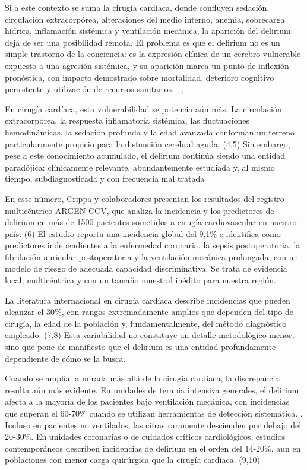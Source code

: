 \documentclass{article}
\begin{document}
Si a este contexto se suma la cirugía cardíaca, donde confluyen sedación, circulación extracorpórea, alteraciones del medio interno, anemia, sobrecarga hídrica, inflamación sistémica y ventilación mecánica, la aparición del delirium deja de ser una posibilidad remota. El problema es que el delirium no es un simple trastorno de la conciencia: es la expresión clínica de un cerebro vulnerable expuesto a una agresión sistémica, y su aparición marca un punto de inflexión pronóstica, con impacto demostrado sobre mortalidad, deterioro cognitivo persistente y utilización de recursos sanitarios. \cite{1262-ELY2004}, \cite{1298-INOUYE2014}, \cite{1299-WILSON2020}

En cirugía cardíaca, esta vulnerabilidad se potencia aún más. La circulación extracorpórea, la respuesta inflamatoria sistémica, las fluctuaciones hemodinámicas, la sedación profunda y la edad avanzada conforman un terreno particularmente propicio para la disfunción cerebral aguda. (4,5) Sin embargo, pese a este conocimiento acumulado, el delirium continúa siendo una entidad paradójica: clínicamente relevante, abundantemente estudiada y, al mismo tiempo, subdiagnosticada y con frecuencia mal tratada

En este número, Crippa y colaboradores presentan los resultados del registro multicéntrico ARGEN-CCV, que analiza la incidencia y los predictores de delirium en más de 1500 pacientes sometidos a cirugía cardiovascular en nuestro país. (6) El estudio reporta una incidencia global del 9,1\% e identifica como predictores independientes a la enfermedad coronaria, la sepsis postoperatoria, la fibrilación auricular postoperatoria y la ventilación mecánica prolongada, con un modelo de riesgo de adecuada capacidad discriminativa. Se trata de evidencia local, multicéntrica y con un tamaño muestral inédito para nuestra región.

La literatura internacional en cirugía cardíaca describe incidencias que pueden alcanzar el 30\%, con rangos extremadamente amplios que dependen del tipo de cirugía, la edad de la población y, fundamentalmente, del método diagnóstico empleado. (7,8) Esta variabilidad no constituye un detalle metodológico menor, sino que pone de manifiesto que el delirium es una entidad profundamente dependiente de cómo se la busca.

Cuando se amplía la mirada más allá de la cirugía cardíaca, la discrepancia resulta aún más evidente. En unidades de terapia intensiva generales, el delirium afecta a la mayoría de los pacientes bajo ventilación mecánica, con incidencias que superan el 60-70\% cuando se utilizan herramientas de detección sistemática. \cite{1262-ELY2004}, \cite{1298-INOUYE2014} Incluso en pacientes no ventilados, las cifras raramente descienden por debajo del 20-30\%. En unidades coronarias o de cuidados críticos cardiológicos, estudios contemporáneos describen incidencias de delirium en el orden del 14-20\%, aun en poblaciones con menor carga quirúrgica que la cirugía cardíaca. (9,10)
\end{document}
